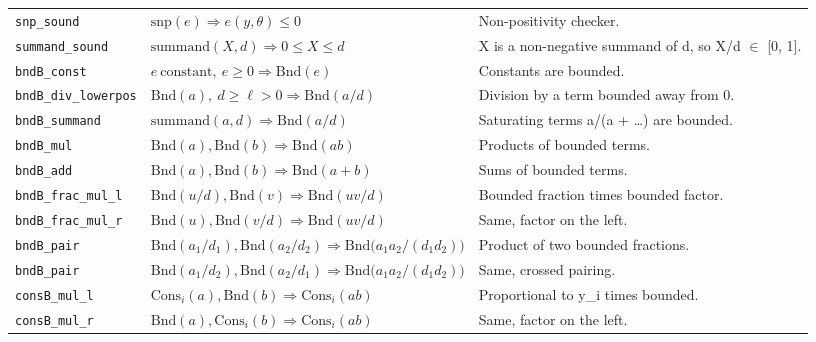 {\begin{longtable}{@{}>{\raggedright\arraybackslash}p{3.6cm}>{\raggedright\arraybackslash}p{6.6cm}>{\raggedright\arraybackslash}p{5.6cm}@{}}
\texttt{snp\_\allowbreak{}sound} & $\displaystyle \mathrm{snp}(e)\Rightarrow e(y,\theta)\le0$ & Non-positivity checker. \\[3pt]
\texttt{summand\_\allowbreak{}sound} & $\displaystyle \mathrm{summand}(X,d)\Rightarrow0\le X\le d$ & X is a non-negative summand of d, so X/d $\in$ [0, 1]. \\[3pt]
\texttt{bndB\_\allowbreak{}const} & $\displaystyle e\ \text{constant},\ e\ge0\Rightarrow\mathrm{Bnd}(e)$ & Constants are bounded. \\[3pt]
\texttt{bndB\_\allowbreak{}div\_\allowbreak{}lowerpos} & $\displaystyle \mathrm{Bnd}(a),\ d\ge\ell>0\Rightarrow\mathrm{Bnd}(a/d)$ & Division by a term bounded away from 0. \\[3pt]
\texttt{bndB\_\allowbreak{}summand} & $\displaystyle \mathrm{summand}(a,d)\Rightarrow\mathrm{Bnd}(a/d)$ & Saturating terms a/(a + \dots{}) are bounded. \\[3pt]
\texttt{bndB\_\allowbreak{}mul} & $\displaystyle \mathrm{Bnd}(a),\mathrm{Bnd}(b)\Rightarrow\mathrm{Bnd}(ab)$ & Products of bounded terms. \\[3pt]
\texttt{bndB\_\allowbreak{}add} & $\displaystyle \mathrm{Bnd}(a),\mathrm{Bnd}(b)\Rightarrow\mathrm{Bnd}(a+b)$ & Sums of bounded terms. \\[3pt]
\texttt{bndB\_\allowbreak{}frac\_\allowbreak{}mul\_\allowbreak{}l} & $\displaystyle \mathrm{Bnd}(u/d),\mathrm{Bnd}(v)\Rightarrow\mathrm{Bnd}(uv/d)$ & Bounded fraction times bounded factor. \\[3pt]
\texttt{bndB\_\allowbreak{}frac\_\allowbreak{}mul\_\allowbreak{}r} & $\displaystyle \mathrm{Bnd}(u),\mathrm{Bnd}(v/d)\Rightarrow\mathrm{Bnd}(uv/d)$ & Same, factor on the left. \\[3pt]
\texttt{bndB\_\allowbreak{}pair} & $\displaystyle \mathrm{Bnd}(a_1/d_1),\mathrm{Bnd}(a_2/d_2)\Rightarrow\mathrm{Bnd}\bigl(a_1a_2/(d_1d_2)\bigr)$ & Product of two bounded fractions. \\[3pt]
\texttt{bndB\_\allowbreak{}pair\textquotesingle{}} & $\displaystyle \mathrm{Bnd}(a_1/d_2),\mathrm{Bnd}(a_2/d_1)\Rightarrow\mathrm{Bnd}\bigl(a_1a_2/(d_1d_2)\bigr)$ & Same, crossed pairing. \\[3pt]
\texttt{consB\_\allowbreak{}mul\_\allowbreak{}l} & $\displaystyle \mathrm{Cons}_i(a),\mathrm{Bnd}(b)\Rightarrow\mathrm{Cons}_i(ab)$ & Proportional to y\_i times bounded. \\[3pt]
\texttt{consB\_\allowbreak{}mul\_\allowbreak{}r} & $\displaystyle \mathrm{Bnd}(a),\mathrm{Cons}_i(b)\Rightarrow\mathrm{Cons}_i(ab)$ & Same, factor on the left. \\[3pt]

\end{longtable}}
